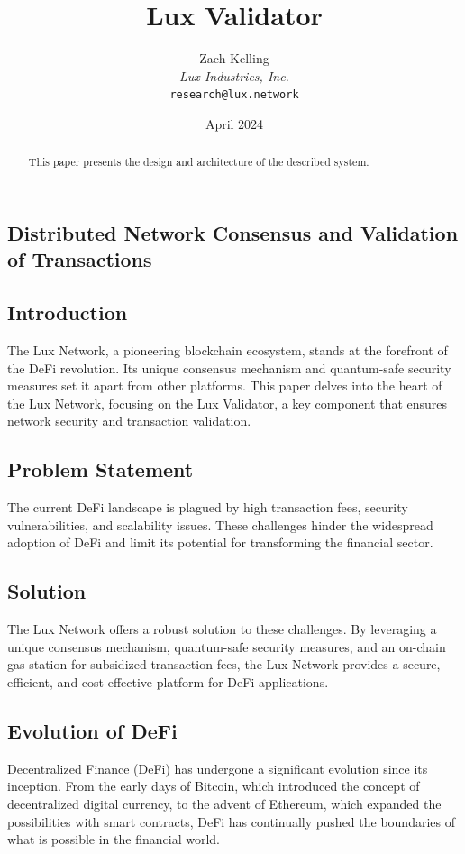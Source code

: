 \documentclass[11pt]{article}
\title{Lux Validator}
\author{Zach Kelling\\\textit{Lux Industries, Inc.}\\\texttt{research@lux.network}}
\date{April 2024}
\begin{document}
\luxcoverpage

\begin{abstract}
This paper presents the design and architecture of the described system.
\end{abstract}

\tableofcontents
\newpage


\subsection{Distributed Network Consensus and Validation of Transactions}

\subsection{Introduction}

The Lux Network, a pioneering blockchain ecosystem, stands at the forefront of the DeFi revolution. Its unique consensus mechanism and quantum-safe security measures set it apart from other platforms. This paper delves into the heart of the Lux Network, focusing on the Lux Validator, a key component that ensures network security and transaction validation.


\subsection{Problem Statement}

The current DeFi landscape is plagued by high transaction fees, security vulnerabilities, and scalability issues. These challenges hinder the widespread adoption of DeFi and limit its potential for transforming the financial sector.


\subsection{Solution}

The Lux Network offers a robust solution to these challenges. By leveraging a unique consensus mechanism, quantum-safe security measures, and an on-chain gas station for subsidized transaction fees, the Lux Network provides a secure, efficient, and cost-effective platform for DeFi applications.


\subsection{Evolution of DeFi}

Decentralized Finance (DeFi) has undergone a significant evolution since its inception. From the early days of Bitcoin, which introduced the concept of decentralized digital currency, to the advent of Ethereum, which expanded the possibilities with smart contracts, DeFi has continually pushed the boundaries of what is possible in the financial world.
\end{document}
